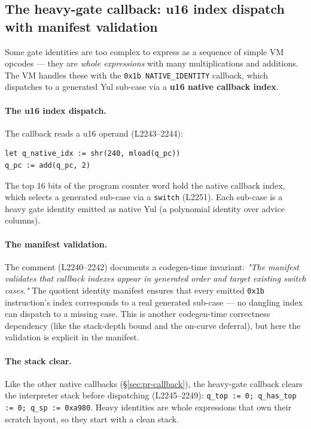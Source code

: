 \subsection{The heavy-gate callback: u16 index dispatch with manifest validation}
\label{sec:pr-heavygate}

Some gate identities are too complex to express as a sequence of
simple VM opcodes --- they are \emph{whole expressions} with many
multiplications and additions. The VM handles these with the
\texttt{0x1b NATIVE\_\allowbreak{}IDENTITY} callback, which dispatches to a
generated Yul sub-case via a \textbf{u16 native callback index}.

\paragraph{The u16 index dispatch.} The callback reads a u16
operand (L2243--2244):
\begin{lstlisting}[style=yul]
let q_native_idx := shr(240, mload(q_pc))
q_pc := add(q_pc, 2)
\end{lstlisting}
The top 16 bits of the program counter word hold the native
callback index, which selects a generated sub-case via a
\texttt{switch} (L2251). Each sub-case is a heavy gate identity
emitted as native Yul (a polynomial identity over advice
columns).

\paragraph{The manifest validation.} The comment (L2240--2242)
documents a codegen-time invariant: \emph{"The manifest validates
that callback indexes appear in generated order and target
existing switch cases."} The quotient identity manifest ensures
that every emitted \texttt{0x1b} instruction's index corresponds
to a real generated sub-case --- no dangling index can dispatch
to a missing case. This is another codegen-time correctness
dependency (like the stack-depth bound and the on-curve
deferral), but here the validation is explicit in the manifest.

\paragraph{The stack clear.} Like the other native callbacks
(§\ref{sec:pr-callback}), the heavy-gate callback clears the
interpreter stack before dispatching (L2245--2249):
\texttt{q\_\allowbreak{}top := 0; q\_\allowbreak{}has\_\allowbreak{}top := 0; q\_\allowbreak{}sp := 0xa980}. Heavy
identities are whole expressions that own their scratch layout,
so they start with a clean stack.

